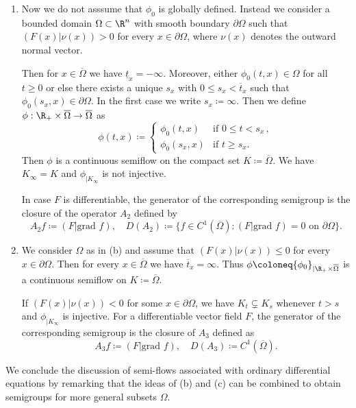 \begin{example}
\begin{enumerate}[\upshape (i), wide, labelindent=.25em]
	\item 
	Now we do not asssume that  $\phi_0$ is globally defined.
	Instead we consider a bounded domain $\Omega \subset \R^n$ with smooth boundary $\partial\Omega$ such that $(F(x)|\nu(x)) > 0$ for every $x \in \partial\Omega$, where $\nu(x)$ denotes the outward normal vector.
	
	Then for $x \in \overline{\Omega}$ we have $\underline{t}_{x} = -\infty$.
	Moreover, either $\phi_{0}(t,x) \in \Omega$ for all $t \geq 0$ or else there exists a unique $s_{x}$ with $0 \leq s_{x} < \overline{t}_{x}$ such that $\phi_{0}(s_{x},x) \in \partial\Omega$.
	In the first case we write $s_{x} \coloneq \infty$.
	Then we define $\phi: \R_{+} \times \overline{\Omega} \to \overline{\Omega}$ as 
	\[\phi(t,x) \coloneq \begin{cases}
		\phi_{0}(t,x) & \text{if } 0 \leq t < s_{x} \,, \\
		\phi_{0}(s_{x},x) & \text{if } t \geq s_{x} .
	\end{cases}\]
	Then $\phi$ is a continuous semiflow on the compact set $K \coloneq \overline{\Omega}$.
	We have $K_{\infty} = K$ and $\phi_{|K_{\infty}}$ is not injective.
	
	In case $F$ is differentiable, the generator of the corresponding semigroup is the closure of the operator $A_{2}$ defined by
	\[
	A_{2}f \coloneq (F|\text{grad }f), \quad D(A_{2}) \coloneq \{f \in C^1(\overline{\Omega}) \colon (F|\text{grad }f) = 0 \text{ on } \partial\Omega\}.	
	\]
	
	\item 
	We consider $\Omega$ as in (b) and assume that $(F(x)|\nu(x)) \leq 0$ for every $x \in \partial\Omega$.
	Then for every $x \in \overline{\Omega}$ we have $\overline{t}_{x} = \infty$.
	Thus $\phi \coloneq {\phi_{0}}_{|\R_{+}\times\overline{\Omega}}$ is a continuous semiflow on $K \coloneq \overline{\Omega}$.
	
	If\/ $(F(x)|\nu(x)) < 0$ for some $x \in \partial\Omega$, we have $K_{t} \subsetneq K_{s}$ whenever $t > s$ and $\phi_{\vert K_{\infty}}$ is injective.
	For a differentiable vector field $F$, the generator of the corresponding semigroup is the closure of\/ $A_{3}$ defined as
	\[
	A_{3}f \coloneq (F|\text{grad }f), \quad D(A_{3}) \coloneq C^1(\overline{\Omega}).
	\]
\end{enumerate}
\end{example}
We conclude the discussion of semi-flows associated with ordinary differential equations by remarking that the ideas of (b) and (c) can be combined to obtain semigroups for more general subsets $\Omega$.

